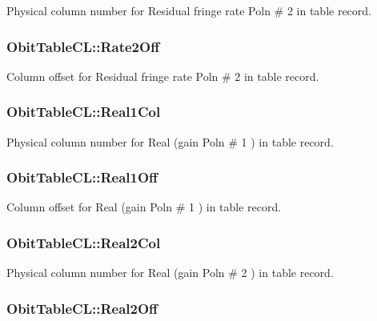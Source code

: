 Physical column number for Residual fringe rate Poln \# 2 in table record. 

\subsubsection{ {\bf Obit\-Table\-CL::Rate2Off}}\label{structObitTableCL_o79}


Column offset for Residual fringe rate Poln \# 2 in table record. 

\subsubsection{ {\bf Obit\-Table\-CL::Real1Col}}\label{structObitTableCL_o54}


Physical column number for Real (gain Poln \# 1 ) in table record. 

\subsubsection{ {\bf Obit\-Table\-CL::Real1Off}}\label{structObitTableCL_o53}


Column offset for Real (gain Poln \# 1 ) in table record. 

\subsubsection{ {\bf Obit\-Table\-CL::Real2Col}}\label{structObitTableCL_o76}


Physical column number for Real (gain Poln \# 2 ) in table record. 

\subsubsection{ {\bf Obit\-Table\-CL::Real2Off}}\label{structObitTableCL_o75}


